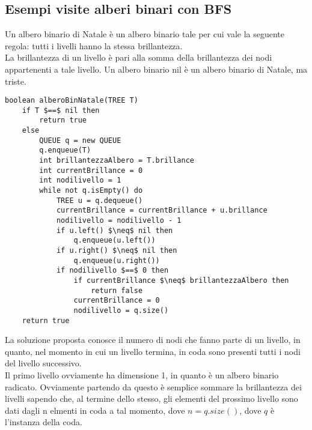 \documentclass[../cheatSheetAlgoritmi.tex]{subfiles}
\begin{document}
\subsection{Esempi visite alberi binari con BFS}
Un albero binario di Natale è un albero binario tale per cui vale la seguente regola: tutti i livelli hanno la stessa brillantezza.  \\La brillantezza di un livello è pari alla somma della brillantezza dei nodi appartenenti a tale livello.  Un albero binario nil è un albero binario di Natale, ma triste.
\begin{lstlisting}[caption=Esempi BFS alberi binari]
boolean alberoBinNatale(TREE T)
	if T $==$ nil then
		return true
	else
		QUEUE q = new QUEUE
		q.enqueue(T)
		int brillantezzaAlbero = T.brillance
		int currentBrillance = 0
		int nodilivello = 1
		while not q.isEmpty() do
			TREE u = q.dequeue()
			currentBrillance = currentBrillance + u.brillance
			nodilivello = nodilivello - 1
			if u.left() $\neq$ nil then
				q.enqueue(u.left())
			if u.right() $\neq$ nil then
				q.enqueue(u.right())
			if nodilivello $==$ 0 then
				if currentBrillance $\neq$ brillantezzaAlbero then
					return false
				currentBrillance = 0
				nodilivello = q.size()
	return true
\end{lstlisting}

\begin{flushleft}
La soluzione proposta conosce il numero di nodi che fanno parte di un livello, in quanto, nel momento in cui un livello termina, in coda sono presenti tutti i nodi del livello successivo. \\
Il primo livello ovviamente ha dimensione 1, in quanto è un albero binario radicato. Ovviamente partendo da questo è semplice sommare la brillantezza dei livelli sapendo che, al termine dello stesso, gli elementi del prossimo livello sono dati dagli n elmenti in coda a tal momento, dove $n = q.size()$, dove $q$ è l'instanza della coda.
\end{flushleft}
\end{document}
